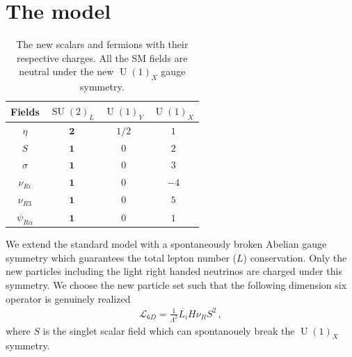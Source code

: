 \documentclass[12pt]{article}
\begin{document}
\section{The model}
\label{sec:Model}
%
\begin{table}[t!]
  \centering
  \begin{tabular}{|c|c|c|c|}
    \hline  
    Fields     & $\operatorname{SU}(2)_L$ & $\operatorname{U}(1)_Y $ & $\operatorname{U}(1)_X$ \\ \hline
    $\eta$  & $\boldsymbol{2}$ & $1/2$  & $1$ \\
    $S$ & $\boldsymbol{1}$ & $0$  & $2$ \\
    $\sigma$ & $\boldsymbol{1}$ & $0$ & $3$ \\
    \hline
    $\nu_{Ri}$ & $\boldsymbol{1}$ & $0$ & $-4$\\
    $\nu_{R3}$ & $\boldsymbol{1}$ & $0$ & $5$\\
    $\psi_{R\alpha}$  & $\boldsymbol{1}$ & 0 & $1$ \\\hline
  \end{tabular}
  \caption{The new scalars and fermions with their respective charges. All the SM fields are neutral under the new $\operatorname{U}(1)_X$ gauge symmetry. }
    \label{tab:partcont}
\end{table}
%
We extend the standard model with a spontaneously broken Abelian gauge symmetry  which guarantees the total lepton number ($L$) conservation. Only the new particles including the light right handed neutrinos are charged under this symmetry. We choose the new particle set such that the following dimension six operator is genuinely realized
\begin{align}
  \label{eq:ld6}
  \mathcal{L}_{6D}=\frac{1}{\Lambda^2} \overline{L_i} H \nu_R S^2\,,
\end{align}
where $S$ is the singlet scalar field which can spontanouely break the $\operatorname{U}(1)_X$ symmetry.
\end{document}
